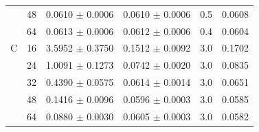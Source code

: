 \documentclass[11pt]{article}
\numberwithin{table}{section}
\numberwithin{figure}{section}
\begin{document}
\begin{table}[H]
{\begin{tabular}{@{}llrrrr@{}}
 & 48 & 0.0610 $\pm$ 0.0006 & 0.0610 $\pm$ 0.0006 & 0.5 & 0.0608 \\
 & 64 & 0.0613 $\pm$ 0.0006 & 0.0612 $\pm$ 0.0006 & 0.4 & 0.0604 \\
\midrule
C & 16 & 3.5952 $\pm$ 0.3750 & 0.1512 $\pm$ 0.0092 & 3.0 & 0.1702 \\
 & 24 & 1.0091 $\pm$ 0.1273 & 0.0742 $\pm$ 0.0020 & 3.0 & 0.0835 \\
 & 32 & 0.4390 $\pm$ 0.0575 & 0.0614 $\pm$ 0.0014 & 3.0 & 0.0651 \\
 & 48 & 0.1416 $\pm$ 0.0096 & 0.0596 $\pm$ 0.0003 & 3.0 & 0.0585 \\
 & 64 & 0.0880 $\pm$ 0.0030 & 0.0605 $\pm$ 0.0003 & 3.0 & 0.0582 \\
\bottomrule
\end{tabular}}
\end{table}

\FloatBarrier
\end{document}
